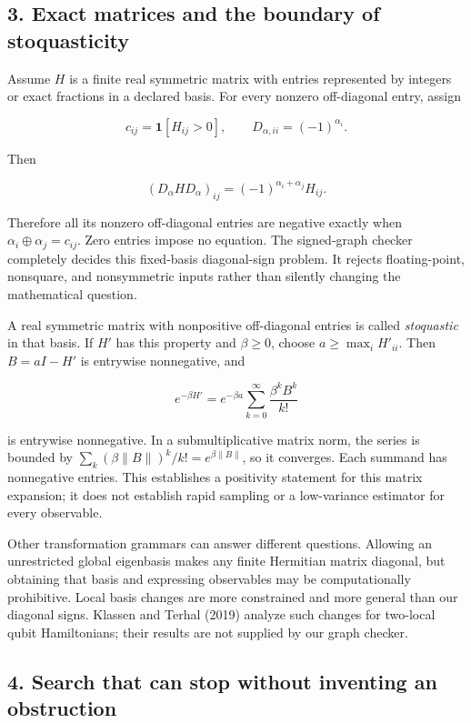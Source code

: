\documentclass[
  11pt,
]{article}
\begin{document}
\hypertarget{exact-matrices-and-the-boundary-of-stoquasticity}{%
\subsection{3. Exact matrices and the boundary of
stoquasticity}\label{exact-matrices-and-the-boundary-of-stoquasticity}}

Assume \(H\) is a finite real symmetric matrix with entries represented
by integers or exact fractions in a declared basis. For every nonzero
off-diagonal entry, assign

\[
c_{ij}=\mathbf{1}[H_{ij}>0],\qquad
D_{\alpha,ii}=(-1)^{\alpha_i}.
\]

Then

\[
(D_\alpha H D_\alpha)_{ij}
=(-1)^{\alpha_i+\alpha_j}H_{ij}.
\]

Therefore all its nonzero off-diagonal entries are negative exactly when
\(\alpha_i\oplus\alpha_j=c_{ij}\). Zero entries impose no equation. The
signed-graph checker completely decides this fixed-basis diagonal-sign
problem. It rejects floating-point, nonsquare, and nonsymmetric inputs
rather than silently changing the mathematical question.

A real symmetric matrix with nonpositive off-diagonal entries is called
\emph{stoquastic} in that basis. If \(H'\) has this property and
\(\beta\geq0\), choose \(a\geq\max_i H'_{ii}\). Then \(B=aI-H'\) is
entrywise nonnegative, and

\[
e^{-\beta H'}=e^{-\beta a}\sum_{k=0}^{\infty}
\frac{\beta^kB^k}{k!}
\]

is entrywise nonnegative. In a submultiplicative matrix norm, the series
is bounded by \(\sum_k(\beta\|B\|)^k/k!=e^{\beta\|B\|}\), so it
converges. Each summand has nonnegative entries. This establishes a
positivity statement for this matrix expansion; it does not establish
rapid sampling or a low-variance estimator for every observable.

Other transformation grammars can answer different questions. Allowing
an unrestricted global eigenbasis makes any finite Hermitian matrix
diagonal, but obtaining that basis and expressing observables may be
computationally prohibitive. Local basis changes are more constrained
and more general than our diagonal signs. Klassen and Terhal (2019)
analyze such changes for two-local qubit Hamiltonians; their results are
not supplied by our graph checker.

\hypertarget{search-that-can-stop-without-inventing-an-obstruction}{%
\subsection{4. Search that can stop without inventing an
obstruction}\label{search-that-can-stop-without-inventing-an-obstruction}}
\end{document}
